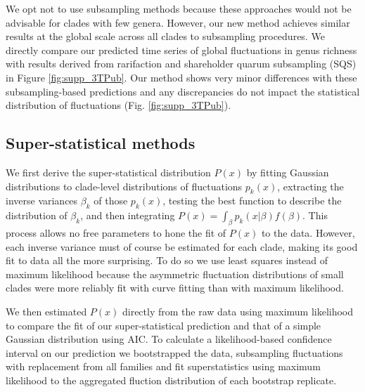 \documentclass[12pt]{article}
\let\citep=\cite
\begin{document}
We opt not to use subsampling methods \citep{miller1996, alroy2010,
  kocsis2018} because these approaches would not be advisable for
clades with few genera. However, our new method achieves similar
results at the global scale across all clades to subsampling
procedures. We directly compare our predicted time series of global
fluctuations in genus richness with results derived from rarifaction
and shareholder quarum subsampling (SQS) in Figure
\ref{fig:supp_3TPub}.  Our method shows very minor differences with
these subsampling-based predictions and any discrepancies do not
impact the statistical distribution of fluctuations
(Fig. \ref{fig:supp_3TPub}).


\subsection{Super-statistical methods} \label{sec:numMeth}

We first derive the super-statistical distribution $P(x)$ by fitting
Gaussian distributions to clade-level distributions of fluctuations
$p_k(x)$, extracting the inverse variances $\beta_k$ of those
$p_k(x)$, testing the best function to describe the distribution of
$\beta_k$, and then integrating
$P(x) = \int_{\beta}p_k(x | \beta) f(\beta)$. This process allows no
free parameters to hone the fit of $P(x)$ to the data.  However, each
inverse variance must of course be estimated for each clade, making
its good fit to data all the more surprising.  To do so we use least
squares instead of maximum likelihood because the asymmetric
fluctuation distributions of small clades were more reliably fit with
curve fitting than with maximum likelihood.

We then estimated $P(x)$ directly from the raw data using maximum
likelihood to compare the fit of our super-statistical prediction and
that of a simple Gaussian distribution using AIC. To calculate a
likelihood-based confidence interval on our prediction we bootstrapped
the data, subsampling fluctuations with replacement from all families
and fit superstatistics using maximum likelihood to the aggregated
fluction distribution of each bootstrap replicate.



\end{document}
